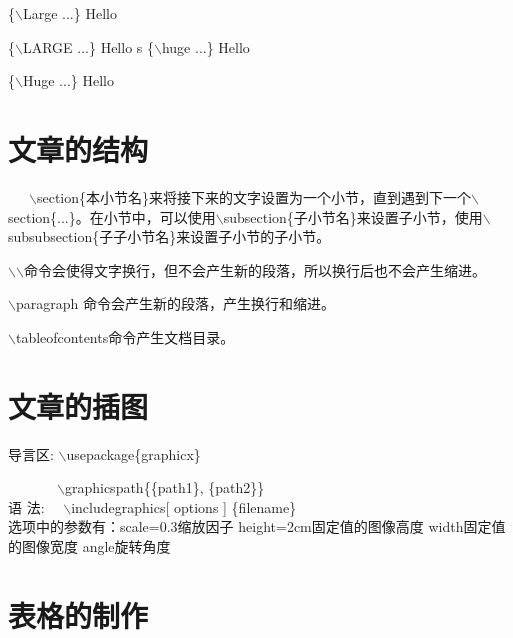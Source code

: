\documentclass{article}
\begin{document}
\begin{CJK}{UTF8}{gbsn}
\{$\backslash$Large ...\}  {\Large Hello}

\{$\backslash$LARGE ...\}  {\LARGE Hello}
s
\{$\backslash$huge ...\}  {\huge Hello}

\{$\backslash$Huge ...\}  {\Huge Hello}
\\
\section{文章的结构}
\ \ \ $\backslash$section\{本小节名\}来将接下来的文字设置为一个小节，直到遇到下一个$\backslash$section\{...\}。在小节中，可以使用$\backslash$subsection\{子小节名\}来设置子小节，使用$\backslash$subsubsection\{子子小节名\}来设置子小节的子小节。

$\backslash$$\backslash$命令会使得文字换行，但不会产生新的段落，所以换行后也不会产生缩进。

$\backslash$paragraph 命令会产生新的段落，产生换行和缩进。

$\backslash$tableofcontents命令产生文档目录。

\section{文章的插图}
导言区: $\backslash$usepackage\{graphicx\}

\ \ \ \ \ \ \ $\backslash$graphicspath\{\{path1\}, \{path2\}\}
\\
语 法:  \ \ $\backslash$includegraphics[ options ] \{filename\}\\
 选项中的参数有：scale=0.3缩放因子 height=2cm固定值的图像高度 width固定值的图像宽度
 angle旋转角度 
 
 \section{表格的制作}

		

\end{CJK}
\end{document}
